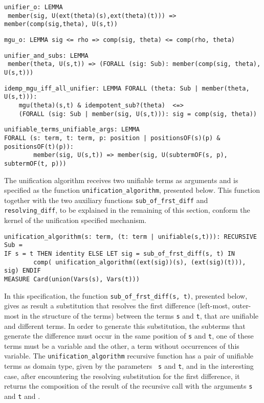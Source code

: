\documentclass[submission,copyright,creativecommons]{eptcs}
\begin{document}
  {\small
\begin{verbatim}
unifier_o: LEMMA
 member(sig, U(ext(theta)(s),ext(theta)(t))) => member(comp(sig,theta), U(s,t))
\end{verbatim}
  } {\small
\begin{verbatim}
mgu_o: LEMMA sig <= rho => comp(sig, theta) <= comp(rho, theta)
\end{verbatim}
  } {\small
\begin{verbatim}
unifier_and_subs: LEMMA
 member(theta, U(s,t)) => (FORALL (sig: Sub): member(comp(sig, theta), U(s,t)))
\end{verbatim}
  } {\small
\begin{verbatim}
idemp_mgu_iff_all_unifier: LEMMA FORALL (theta: Sub | member(theta, U(s,t))):
    mgu(theta)(s,t) & idempotent_sub?(theta)  <=>
    (FORALL (sig: Sub | member(sig, U(s,t))): sig = comp(sig, theta))
\end{verbatim}
  } {\small
\begin{verbatim}
unifiable_terms_unifiable_args: LEMMA
FORALL (s: term, t: term, p: position | positionsOF(s)(p) & positionsOF(t)(p)):
        member(sig, U(s,t)) => member(sig, U(subtermOF(s, p), subtermOF(t, p)))
\end{verbatim}
  }

  The unification algorithm receives two unifiable terms as arguments
  and is specified as the function {\tt unification\_algorithm},
  presented below. This function together with the two auxiliary
  functions {\tt sub\_of\_frst\_diff} and {\tt resolving\_diff}, to be
  explained in the remaining of this section, conform the kernel of
  the unification specified mechanism.

  {\small
\begin{verbatim}
unification_algorithm(s: term, (t: term | unifiable(s,t))): RECURSIVE Sub = 
IF s = t THEN identity ELSE LET sig = sub_of_frst_diff(s, t) IN
        comp( unification_algorithm((ext(sig))(s), (ext(sig)(t))), sig) ENDIF
MEASURE Card(union(Vars(s), Vars(t)))
\end{verbatim}
  }

  In this specification, the function {\tt sub\_of\_frst\_diff(s, t)},
  presented below, gives as result a substitution that resolves the
  first difference (left-most, outer-most in the structure of the
  terms) between the terms {\tt s} and {\tt t}, that are unifiable and
  different terms. In order to generate this substitution, the
  subterms that generate the difference must occur in the same
  position of {\tt s} and {\tt t}, one of these terms must be a
  variable and the other, a term without occurrences of this
  variable. The {\tt unification\_algorithm} recursive function has a
  pair of unifiable terms as domain type, given by the parameters {\tt
    s} and {\tt t}, and in the interesting case, after encountering
  the resolving substitution  for the first difference, it
  returns the composition of the result of the recursive call with the
  arguments {\tt s} and {\tt t} and
  .
\end{document}
